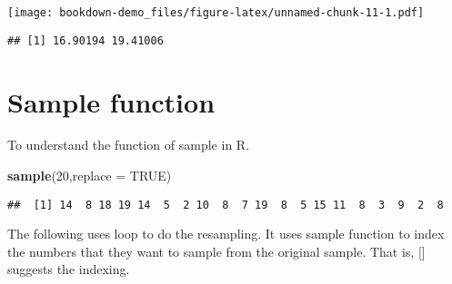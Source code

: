 \documentclass[]{book}
\newenvironment{Shaded}{\begin{snugshade}}{\end{snugshade}}
\newcommand{\ControlFlowTok}[1]{\textcolor[rgb]{0.13,0.29,0.53}{\textbf{#1}}}
\newcommand{\DataTypeTok}[1]{\textcolor[rgb]{0.13,0.29,0.53}{#1}}
\newcommand{\DecValTok}[1]{\textcolor[rgb]{0.00,0.00,0.81}{#1}}
\newcommand{\KeywordTok}[1]{\textcolor[rgb]{0.13,0.29,0.53}{\textbf{#1}}}
\newcommand{\NormalTok}[1]{#1}
\newcommand{\OperatorTok}[1]{\textcolor[rgb]{0.81,0.36,0.00}{\textbf{#1}}}
\newcommand{\OtherTok}[1]{\textcolor[rgb]{0.56,0.35,0.01}{#1}}
\newcommand{\StringTok}[1]{\textcolor[rgb]{0.31,0.60,0.02}{#1}}
\begin{document}
\texttt{[image: bookdown-demo\_files/figure-latex/unnamed-chunk-11-1.pdf]}

\begin{verbatim}
## [1] 16.90194 19.41006
\end{verbatim}

\hypertarget{sample-function}{%
\section{Sample function}\label{sample-function}}

To understand the function of sample in R.

\begin{Shaded}
\begin{Highlighting}[]
\KeywordTok{sample}\NormalTok{(}\DecValTok{20}\NormalTok{,}\DataTypeTok{replace =} \OtherTok{TRUE}\NormalTok{)}
\end{Highlighting}
\end{Shaded}

\begin{verbatim}
##  [1] 14  8 18 19 14  5  2 10  8  7 19  8  5 15 11  8  3  9  2  8
\end{verbatim}

The following uses loop to do the resampling. It uses sample function to index the numbers that they want to sample from the original sample. That is, {[}{]} suggests the indexing.

\begin{Shaded}
\end{Shaded}
\end{document}
